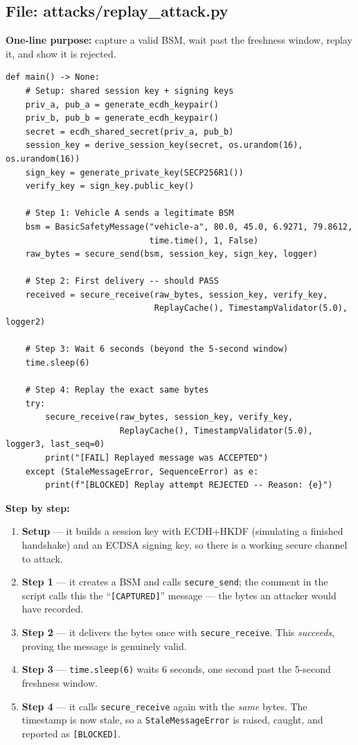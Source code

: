 \documentclass[11pt,a4paper]{article}
\begin{document}
\subsection{File: attacks/replay\_attack.py}
\textbf{One-line purpose:} capture a valid BSM, wait past the freshness window,
replay it, and show it is rejected.
\begin{lstlisting}[style=py,caption={replay\_attack.py --- the replay attack (key parts).}]
def main() -> None:
    # Setup: shared session key + signing keys
    priv_a, pub_a = generate_ecdh_keypair()
    priv_b, pub_b = generate_ecdh_keypair()
    secret = ecdh_shared_secret(priv_a, pub_b)
    session_key = derive_session_key(secret, os.urandom(16), os.urandom(16))
    sign_key = generate_private_key(SECP256R1())
    verify_key = sign_key.public_key()

    # Step 1: Vehicle A sends a legitimate BSM
    bsm = BasicSafetyMessage("vehicle-a", 80.0, 45.0, 6.9271, 79.8612,
                             time.time(), 1, False)
    raw_bytes = secure_send(bsm, session_key, sign_key, logger)

    # Step 2: First delivery -- should PASS
    received = secure_receive(raw_bytes, session_key, verify_key,
                              ReplayCache(), TimestampValidator(5.0), logger2)

    # Step 3: Wait 6 seconds (beyond the 5-second window)
    time.sleep(6)

    # Step 4: Replay the exact same bytes
    try:
        secure_receive(raw_bytes, session_key, verify_key,
                       ReplayCache(), TimestampValidator(5.0), logger3, last_seq=0)
        print("[FAIL] Replayed message was ACCEPTED")
    except (StaleMessageError, SequenceError) as e:
        print(f"[BLOCKED] Replay attempt REJECTED -- Reason: {e}")
\end{lstlisting}
\textbf{Step by step:}
\begin{enumerate}
  \item \textbf{Setup} --- it builds a session key with ECDH+HKDF (simulating a
        finished handshake) and an ECDSA signing key, so there is a working
        secure channel to attack.
  \item \textbf{Step 1} --- it creates a BSM and calls \texttt{secure\_send}; the
        comment in the script calls this the ``\texttt{[CAPTURED]}'' message ---
        the bytes an attacker would have recorded.
  \item \textbf{Step 2} --- it delivers the bytes once with
        \texttt{secure\_receive}. This \emph{succeeds}, proving the message is
        genuinely valid.
  \item \textbf{Step 3} --- \texttt{time.sleep(6)} waits 6 seconds, one second
        past the 5-second freshness window.
  \item \textbf{Step 4} --- it calls \texttt{secure\_receive} again with the
        \emph{same} bytes. The timestamp is now stale, so a
        \texttt{StaleMessageError} is raised, caught, and reported as
        \texttt{[BLOCKED]}.
\end{enumerate}
\end{document}
